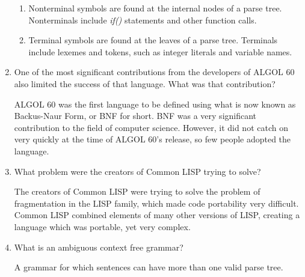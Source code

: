 \begin{enumerate}
  \begin{answer}

  \begin{enumerate}
    \item Nonterminal symbols are found at the internal nodes of a parse tree. Nonterminals include \textit{if()} statements and other function calls.
    \item Terminal symbols are found at the leaves of a parse tree. Terminals include lexemes and tokens, such as integer literals and variable names.
    \end{enumerate}

    \end{answer}


  \item One of the most significant contributions from the developers
    of ALGOL 60 also limited the success of that language. What was
    that contribution?

  \begin{answer}

    ALGOL 60 was the first language to be defined using what is now known as Backus-Naur Form, or BNF for short. BNF was a very significant contribution to the field of computer science. However, it did not catch on very quickly at the time of ALGOL 60's release, so few people adopted the language.

    \end{answer}

  \item What problem were the creators of Common LISP trying to solve?

  \begin{answer}

    The creators of Common LISP were trying to solve the problem of fragmentation in the LISP family, which made code portability very difficult. Common LISP combined elements of many other versions of LISP, creating a language which was portable, yet very complex.

    \end{answer}

  \item What is an ambiguous context free grammar?

  \begin{answer}

    A grammar for which sentences can have more than one valid parse tree.

    \end{answer}


\end{enumerate}

